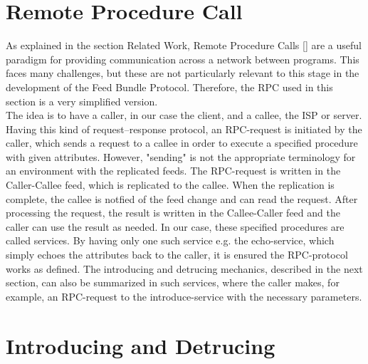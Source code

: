 \section{Remote Procedure Call}
As explained in the section Related Work, Remote Procedure Calls [] are a useful paradigm for providing communication across a
network between programs. This faces many challenges, but these are not particularly relevant to this stage in the development of the Feed Bundle Protocol. Therefore, the RPC used in this section is a very simplified version.\\
The idea is to have a caller, in our case the client, and a callee, the ISP or server. Having this kind of request–response protocol, an RPC-request is initiated by the caller, which sends a request to a callee in order to execute a specified procedure with given attributes. However, "sending" is not the appropriate terminology for an environment with the replicated feeds. The RPC-request is written in the Caller-Callee feed, which is replicated to the callee. When the replication is complete, the callee is notfied of the feed change and can read the request. After processing the request, the result is written in the Callee-Caller feed and the caller can use the result as needed. In our case, these specified procedures are called services. By having only one such service e.g. the echo-service, which simply echoes the attributes back to the caller, it is ensured the RPC-protocol works as defined. The introducing and detrucing mechanics, described in the next section, can also be summarized in such services, where the caller makes, for example, an RPC-request to the introduce-service with the necessary parameters. 

\section{Introducing and Detrucing}
